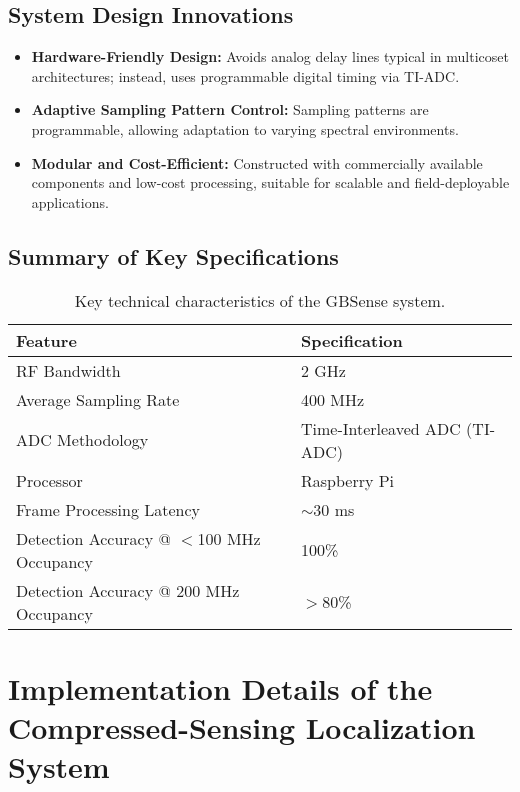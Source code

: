 \documentclass[14pt]{book}
\begin{document}
\subsection{System Design Innovations}

\begin{itemize}
	\item \textbf{Hardware-Friendly Design:} Avoids analog delay lines typical in multicoset architectures; instead, uses programmable digital timing via TI-ADC.
	
	\item \textbf{Adaptive Sampling Pattern Control:} Sampling patterns are programmable, allowing adaptation to varying spectral environments.
	
	\item \textbf{Modular and Cost-Efficient:} Constructed with commercially available components and low-cost processing, suitable for scalable and field-deployable applications.
\end{itemize}

\subsection{Summary of Key Specifications}

\begin{table}[h]
	\centering
	\begin{tabular}{@{}ll@{}}
		\toprule
		\textbf{Feature} & \textbf{Specification} \\
		\midrule
		RF Bandwidth & 2 GHz \\
		Average Sampling Rate & 400 MHz \\
		ADC Methodology & Time-Interleaved ADC (TI-ADC) \\
		Processor & Raspberry Pi \\
		Frame Processing Latency & $\sim$30 ms \\
		Detection Accuracy @ $<$100 MHz Occupancy & 100\% \\
		Detection Accuracy @ 200 MHz Occupancy & $>$80\% \\
		\bottomrule
	\end{tabular}
	\caption{Key technical characteristics of the GBSense system.}
	\label{tab:gbsense_specs}
\end{table}

\section{Implementation Details of the Compressed-Sensing Localization System}
\end{document}
